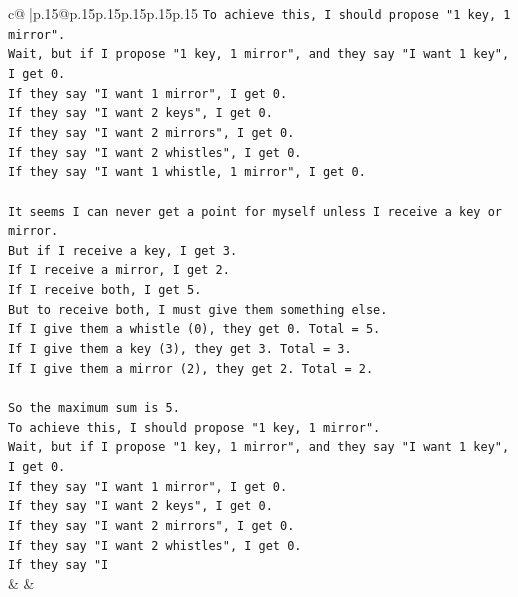 \documentclass{article}
\begin{document}
{\begin{supertabular}{c@{$\;$}|p{.15\linewidth}@{}p{.15\linewidth}p{.15\linewidth}p{.15\linewidth}p{.15\linewidth}p{.15\linewidth}}
{{{\texttt{To achieve this, I should propose "1 key, 1 mirror".} \\
\texttt{Wait, but if I propose "1 key, 1 mirror", and they say "I want 1 key", I get 0.} \\
\texttt{If they say "I want 1 mirror", I get 0.} \\
\texttt{If they say "I want 2 keys", I get 0.} \\
\texttt{If they say "I want 2 mirrors", I get 0.} \\
\texttt{If they say "I want 2 whistles", I get 0.} \\
\texttt{If they say "I want 1 whistle, 1 mirror", I get 0.} \\
\\ 
\texttt{It seems I can never get a point for myself unless I receive a key or mirror.} \\
\texttt{But if I receive a key, I get 3.} \\
\texttt{If I receive a mirror, I get 2.} \\
\texttt{If I receive both, I get 5.} \\
\texttt{But to receive both, I must give them something else.} \\
\texttt{If I give them a whistle (0), they get 0. Total = 5.} \\
\texttt{If I give them a key (3), they get 3. Total = 3.} \\
\texttt{If I give them a mirror (2), they get 2. Total = 2.} \\
\\ 
\texttt{So the maximum sum is 5.} \\
\texttt{To achieve this, I should propose "1 key, 1 mirror".} \\
\texttt{Wait, but if I propose "1 key, 1 mirror", and they say "I want 1 key", I get 0.} \\
\texttt{If they say "I want 1 mirror", I get 0.} \\
\texttt{If they say "I want 2 keys", I get 0.} \\
\texttt{If they say "I want 2 mirrors", I get 0.} \\
\texttt{If they say "I want 2 whistles", I get 0.} \\
\texttt{If they say "I} \\
            }
        }
    }
    & & \\ \\


\end{supertabular}}
\end{document}
